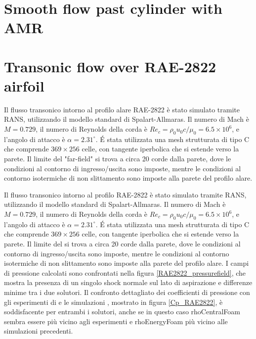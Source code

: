 \documentclass[a5paper]{sapthesis}
\begin{document}
	\section{Smooth flow past cylinder with AMR}
	\label{AMR_cylinder}
	
	\section{Transonic flow over RAE-2822 airfoil}
	Il flusso transonico intorno al profilo alare RAE-2822 è stato simulato tramite RANS, utilizzando il modello standard di Spalart-Allmaras. Il numero di Mach è $M = 0.729$, il numero di Reynolds della corda è $Re_c = \rho_0 u_0 c /\mu_0 = 6.5 \times 10^6$, e l'angolo di attacco è $\alpha = 2.31^\circ$. \'E stata utilizzata una mesh strutturata di tipo C che comprende $369 \times 256$ celle, con tangente iperbolica che si estende verso la parete. Il limite del "far-field" si trova a circa 20 corde dalla parete, dove le condizioni al contorno di ingresso/uscita sono imposte, mentre le condizioni al contorno isotermiche di non slittamento sono imposte alla parete del profilo alare.
	
		Il flusso transonico intorno al profilo RAE-2822 è stato simulato tramite RANS, utilizzando il modello standard di Spalart-Allmaras. Il numero di Mach è $M = 0.729$, il numero di Reynolds della corda è $Re_c = \rho_0 u_0 c /\mu_0 = 6.5 \times 10^6$, e l'angolo di attacco è $\alpha = 2.31^\circ$. \'E stata utilizzata una mesh strutturata di tipo C che comprende $369 \times 256$ celle, con tangente iperbolica che si estende verso la parete. Il limite del  si trova a circa 20 corde dalla parete, dove le condizioni al contorno di ingresso/uscita sono imposte, mentre le condizioni al contorno isotermiche di non slittamento sono imposte alla parete del profilo alare. I campi di pressione calcolati sono confrontati nella figura \ref{RAE2822_pressurefield}, che mostra la presenza di un singolo shock normale sul lato di aspirazione e differenze minime tra i due solutori. Il confronto dettagliato dei coeﬃcienti di pressione con gli esperimenti di \citet{cook1977aerofoil} e le simulazioni \cite{slater2010rae2822}, mostrato in figura \ref{Cp_RAE2822}, è soddisfacente per entrambi i solutori, anche se in questo caso rhoCentralFoam sembra essere più vicino agli esperimenti e rhoEnergyFoam più vicino alle simulazioni precedenti.
	
\end{document}
